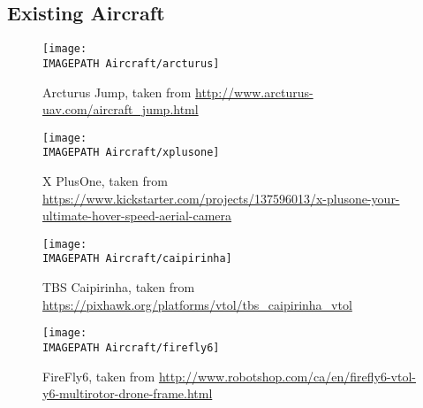 \subsection*{Existing Aircraft}
\begin{figure}[!h]
	\centering
	\texttt{[image: \\IMAGEPATH Aircraft/arcturus]}
	\caption{Arcturus Jump, taken from \url{http://www.arcturus-uav.com/aircraft_jump.html}}
	\label{fig:arcturus}
\end{figure}

\begin{figure}[!h]
	\centering
	\texttt{[image: \\IMAGEPATH Aircraft/xplusone]}
	\caption[caption]{X PlusOne, taken from\\ \url{https://www.kickstarter.com/projects/137596013/x-plusone-your-ultimate-hover-speed-aerial-camera}}
	\label{fig:xplusone}
\end{figure}

\begin{figure}[!h]
	\centering
	\texttt{[image: \\IMAGEPATH Aircraft/caipirinha]}
	\caption{TBS Caipirinha, taken from \url{https://pixhawk.org/platforms/vtol/tbs_caipirinha_vtol}}
	\label{fig:caipirinha}
\end{figure}

\begin{figure}[!h]
	\centering
	\texttt{[image: \\IMAGEPATH Aircraft/firefly6]}
	\caption{FireFly6, taken from \url{http://www.robotshop.com/ca/en/firefly6-vtol-y6-multirotor-drone-frame.html}}
	\label{fig:firefly}
\end{figure}

